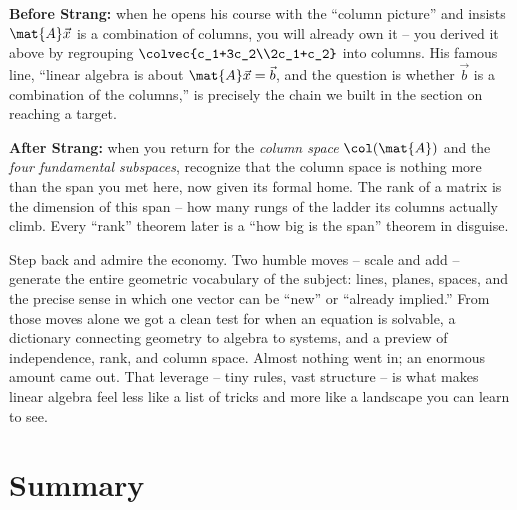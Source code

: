 \begin{strangbox}
\textbf{Before Strang:} when he opens his course with the ``column picture'' and insists $\mat{A}\vec{x}$ is a combination of columns, you will already own it -- you derived it above by regrouping $\colvec{c_1+3c_2\\2c_1+c_2}$ into columns. His famous line, ``linear algebra is about $\mat{A}\vec{x}=\vec{b}$, and the question is whether $\vec{b}$ is a combination of the columns,'' is precisely the chain we built in the section on reaching a target.

\textbf{After Strang:} when you return for the \emph{column space} $\col(\mat{A})$ and the \emph{four fundamental subspaces}, recognize that the column space is nothing more than the span you met here, now given its formal home. The rank of a matrix is the dimension of this span -- how many rungs of the ladder its columns actually climb. Every ``rank'' theorem later is a ``how big is the span'' theorem in disguise.
\end{strangbox}

\begin{aestheticbox}
Step back and admire the economy. Two humble moves -- scale and add -- generate the entire geometric vocabulary of the subject: lines, planes, spaces, and the precise sense in which one vector can be ``new'' or ``already implied.'' From those moves alone we got a clean test for when an equation is solvable, a dictionary connecting geometry to algebra to systems, and a preview of independence, rank, and column space. Almost nothing went in; an enormous amount came out. That leverage -- tiny rules, vast structure -- is what makes linear algebra feel less like a list of tricks and more like a landscape you can learn to see.
\end{aestheticbox}

\section{Summary}

